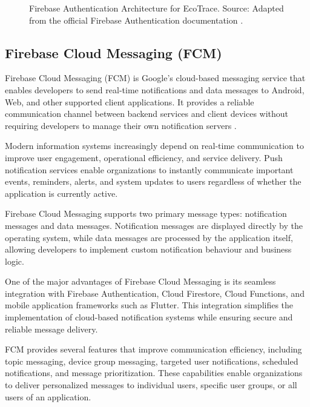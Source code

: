 \begin{figure}[H]
  \centering
  \caption{Firebase Authentication Architecture for EcoTrace. Source: Adapted from the official Firebase Authentication documentation \citep{firebase2025auth}.}
  \label{fig:firebase-auth-arch}
\end{figure}

\subsection{Firebase Cloud Messaging (FCM)}

Firebase Cloud Messaging (FCM) is Google's cloud-based messaging service that
enables developers to send real-time notifications and data messages to Android,
Web, and other supported client applications. It provides a reliable
communication channel between backend services and client devices without
requiring developers to manage their own notification servers \citep{firebase2025fcm}.

Modern information systems increasingly depend on real-time communication
to improve user engagement, operational efficiency, and service delivery. Push
notification services enable organizations to instantly communicate important
events, reminders, alerts, and system updates to users regardless of whether the
application is currently active.

Firebase Cloud Messaging supports two primary message types: notification
messages and data messages. Notification messages are displayed directly by the
operating system, while data messages are processed by the application itself,
allowing developers to implement custom notification behaviour and business
logic.

One of the major advantages of Firebase Cloud Messaging is its seamless
integration with Firebase Authentication, Cloud Firestore, Cloud Functions, and
mobile application frameworks such as Flutter. This integration simplifies the
implementation of cloud-based notification systems while ensuring secure and
reliable message delivery.

FCM provides several features that improve communication efficiency,
including topic messaging, device group messaging, targeted user notifications,
scheduled notifications, and message prioritization. These capabilities enable
organizations to deliver personalized messages to individual users, specific user
groups, or all users of an application.


